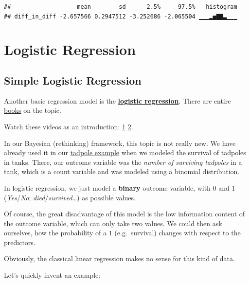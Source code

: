 \documentclass[
]{book}
\begin{document}
\begin{verbatim}
##                   mean        sd      2.5%     97.5%   histogram
## diff_in_diff -2.657566 0.2947512 -3.252686 -2.065504 ▁▁▁▂▅▇▇▃▁▁▁
\end{verbatim}

\section{Logistic Regression}\label{logistic_regression}

\subsection{Simple Logistic Regression}\label{simple_logistic_regression}

Another basic regression model is the \href{https://en.wikipedia.org/wiki/Logistic_regression}{\textbf{logistic regression}}.
There are entire \href{https://onlinelibrary.wiley.com/doi/book/10.1002/9781118548387}{books} on the topic.

Watch these videos as an introduction:
\href{https://www.youtube.com/watch?v=yIYKR4sgzI8&ab_channel=StatQuestwithJoshStarmer}{1}
\href{https://www.youtube.com/watch?v=Iju8l2qgaJU&t=330s&ab_channel=VeryNormal}{2}.

In our Bayesian (rethinking) framework, this topic is not really new.
We have already used it in our \href{https://jdegenfellner.github.io/Script_QM3_ZHAW/further-regression-methods.html\#model13_1}{tadpole example}
when we modeled the survival of tadpoles in tanks.
There, our outcome variable was the \emph{number of surviving tadpoles} in a tank,
which is a count variable and was modeled using a binomial distribution.

In logistic regression, we just model a \textbf{binary} outcome variable,
with \(0\) and \(1\) (\emph{Yes}/\emph{No}; \emph{died}/\emph{survived}\ldots) as possible values.

Of course, the great disadvantage of this model is the low
information content of the outcome variable,
which can only take two values. We could then ask ourselves,
how the probability of a \(1\) (e.g.~survival) changes with respect to the predictors.

Obviously, the classical linear regression makes no sense for this kind of data.

Let's quickly invent an example:
\end{document}
